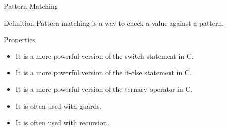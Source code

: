 \begin{frame}{Pattern Matching}
    \begin{block}{Definition}
        Pattern matching is a way to check a value against a pattern.
    \end{block}
    \begin{block}{Properties}
        \begin{itemize}
            \item It is a more powerful version of the switch statement in C.
            \item It is a more powerful version of the if-else statement in C.
            \item It is a more powerful version of the ternary operator in C.
            \item It is often used with guards.
            \item It is often used with recursion.
        \end{itemize}
    \end{block}
\end{frame}